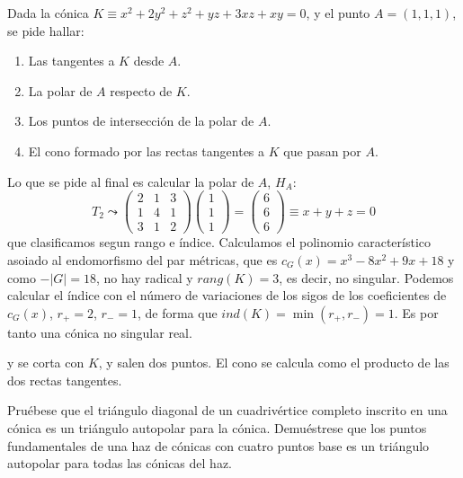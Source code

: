 \begin{ejer}
    [15] Dada la c\'onica $K \equiv x^2 + 2y^2 + z^2 + yz + 3xz + xy = 0$, y el punto $A = (1, 1, 1)$, se pide hallar:
    \begin{enumerate}
        \item Las tangentes a $K$ desde $A$.
        \item La polar de $A$ respecto de $K$. 
        \item Los puntos de intersecci\'on de la polar de $A$.
        \item El cono formado por las rectas tangentes a $K$ que pasan por $A$.
    \end{enumerate}
\end{ejer}
\begin{sol}
    Lo que se pide al final es calcular la polar de $A$, $H_A$:
    $$T_2 \leadsto \begin{pmatrix}
        2 & 1 & 3 \\ 1 & 4 & 1 \\ 3 & 1 & 2 
    \end{pmatrix}\begin{pmatrix}
        1 \\ 1\\ 1
    \end{pmatrix}=\begin{pmatrix}
        6 \\ 6 \\ 6
    \end{pmatrix} \equiv x+y+z=0$$
    que clasificamos segun rango e índice. Calculamos el polinomio caracter\'istico asoiado al endomorfismo del par m\'etricas, que es $c_G(x)=x^3-8x^2+9x+18$ y como $-|G|=18$, no hay radical y $rang(K)=3$, es decir, no singular. Podemos calcular el \'indice con el n\'umero de variaciones de los sigos de los coeficientes de $c_G(x)$, $r_+=2$, $r_-=1$, de forma que $ind(K)=\min(r_+,r_-)=1$. Es por tanto una c\'onica no singular real.
    
    y se corta con $K$, y salen dos puntos. El cono se calcula como el producto de las dos rectas tangentes. 
\end{sol}
\begin{ejer}
    [17] Pru\'ebese que el tri\'angulo diagonal de un cuadriv\'ertice completo inscrito en una c\'onica es un tri\'angulo autopolar para la c\'onica. Demu\'estrese que los puntos fundamentales de una haz de c\'onicas con cuatro puntos base es un tri\'angulo autopolar para todas las c\'onicas del haz.
\end{ejer}
